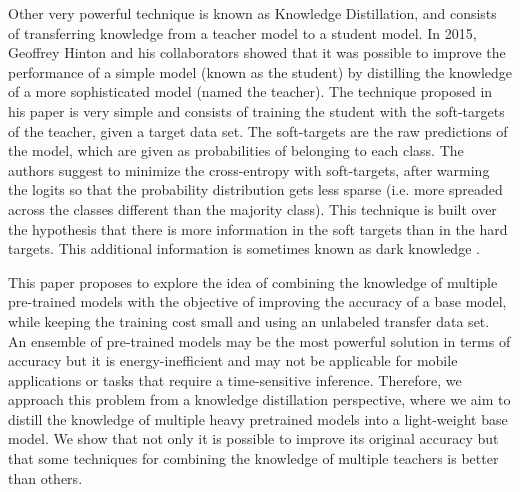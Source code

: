\documentclass{elsarticle}
\begin{document}
	Other very powerful technique is known as Knowledge Distillation, and consists of transferring knowledge from a teacher model to a student model. In 2015, Geoffrey Hinton and his collaborators \cite{hinton2015} showed that it was possible to improve the performance of a simple model (known as the student) by distilling the knowledge of a more sophisticated model (named the teacher). The technique proposed in his paper is very simple and consists of training the student with the soft-targets of the teacher, given a target data set. The soft-targets are the raw predictions of the model, which are given as probabilities of belonging to each class. The authors suggest to minimize the cross-entropy with soft-targets, after warming the logits so that the probability distribution gets less sparse (i.e. more spreaded across the classes different than the majority class). This technique is built over the hypothesis that there is more information in the soft targets than in the hard targets. This additional information is sometimes known as dark knowledge \cite{gou2020}.
	
	
	 This paper proposes to explore the idea of combining the knowledge of multiple pre-trained models with the objective of improving the accuracy of a base model, while keeping the training cost small and using an unlabeled transfer data set. 	An ensemble of pre-trained models may be the most powerful solution in terms of accuracy but it is energy-inefficient and may not be applicable for mobile applications or tasks that require a time-sensitive inference. Therefore, we approach this problem from a knowledge distillation perspective, where we aim to distill the knowledge of multiple heavy pretrained models into a light-weight base model. We show that not only it is possible to improve its original accuracy but that some techniques for combining the knowledge of multiple teachers is better than others. 
	
\end{document}
